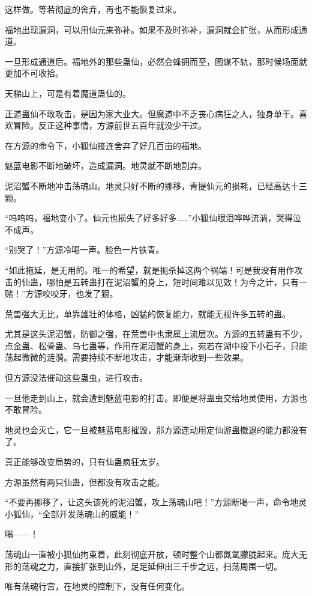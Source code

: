\begin{this_body}
这样做。等若彻底的舍弃，再也不能恢复过来。

福地出现漏洞，可以用仙元来弥补。如果不及时弥补，漏洞就会扩张，从而形成通道。

一旦形成通道后。福地外的那些蛊仙，必然会蜂拥而至，图谋不轨，那时候场面就更加不可收拾。

天梯山上，可是有着魔道蛊仙的。

正道蛊仙不敢攻击，是因为家大业大。但魔道中不乏丧心病狂之人，独身单干。喜欢冒险。反正这种事情，方源前世五百年就没少干过。

在方源的命令下，小狐仙接连舍弃了好几百亩的福地。

魅蓝电影不断地破坏，造成漏洞。地灵就不断地割弃。

泥沼蟹不断地冲击荡魂山。地灵只好不断的挪移，青提仙元的损耗，已经高达十三颗。

“呜呜呜，福地变小了。仙元也损失了好多好多……”小狐仙眼泪哗哗流淌，哭得泣不成声。

“别哭了！”方源冷喝一声。脸色一片铁青。

“如此拖延，是无用的。唯一的希望，就是扼杀掉这两个祸端！可是我没有用作攻击的仙蛊，哪怕是五转蛊打在泥沼蟹的身上，短时间难以见效！为今之计，只有一赌！”方源咬咬牙，也发了狠。

荒兽强大无比，单靠雄壮的体格，凶猛的恢复能力，就能无视许多五转的蛊。

尤其是这头泥沼蟹，防御之强，在荒兽中也隶属上流层次。方源的五转蛊有不少，点金蛊、松骨蛊、乌七蛊等，作用在泥沼蟹的身上，宛若在湖中投下小石子，只能荡起微微的涟漪。需要持续不断地攻击，才能渐渐收到一些效果。

但方源没法催动这些蛊虫，进行攻击。

一旦他走到山上，就会遭到魅蓝电影的打击。即便是将蛊虫交给地灵使用，方源也不敢冒险。

地灵也会灭亡，它一旦被魅蓝电影摧毁，那方源连动用定仙游蛊撤退的能力都没有了。

真正能够改变局势的，只有仙蛊疯狂太岁。

方源虽然有两只仙蛊，但都没有攻击之能。

“不要再挪移了，让这头该死的泥沼蟹，攻上荡魂山吧！”方源断喝一声，命令地灵小狐仙，“全部开发荡魂山的威能！”

嗡——！

荡魂山一直被小狐仙拘束着，此刻彻底开放，顿时整个山都氤氲朦胧起来。庞大无形的荡魂之力，直接扩张到山外，足足延伸出三千步之远，扫荡周围一切。

唯有荡魂行宫，在地灵的控制下，没有任何变化。


\end{this_body}
